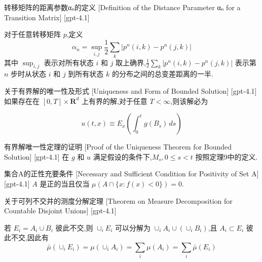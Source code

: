 \documentclass[UTF8]{ctexart}
\begin{document}
    
    
    \begin{dfn}
        {转移矩阵的距离参数αₙ的定义}
        [Definition of the Distance Parameter αₙ for a Transition Matrix]
        [gpt-4.1]
        
对于任意转移矩阵 $p$,定义
\[
\alpha_{n} = \sup_{i, j} \frac{1}{2} \sum_{k} |p^{n}(i, k) - p^{n}(j, k)|
\]
其中 $\sup_{i, j}$ 表示对所有状态 $i$ 和 $j$ 取上确界,$\frac{1}{2} \sum_{k} |p^{n}(i, k) - p^{n}(j, k)|$ 表示第 $n$ 步时从状态 $i$ 和 $j$ 到所有状态 $k$ 的分布之间的总变差距离的一半.

    \end{dfn}
    
    
    
    \begin{thm}
        {关于有界解的唯一性及形式}
        [Uniqueness and Form of Bounded Solution]
        [gpt-4.1]
        如果存在在 $[0, T] \times \mathbf{R}^{d}$ 上有界的解,对于任意 $T < \infty$,则该解必为

\[
u(t, x) \equiv E_{x} \left( \int_{0}^{t} g(B_{s})\, ds \right)
\]

    \end{thm}
    
    
    
    \begin{prf}
        {有界解唯一性定理的证明}
        [Proof of the Uniqueness Theorem for Bounded Solution]
        [gpt-4.1]
        在 $g$ 和 $u$ 满足假设的条件下,$M_{s}, 0 \le s < t$ 按照定理9中的定义.
    \end{prf}
    
    
    
    \begin{thm}
        {集合A的正性充要条件}
        [Necessary and Sufficient Condition for Positivity of Set A]
        [gpt-4.1]
        $A$ 是正的当且仅当 $\mu(A \cap \{x : f(x) < 0\}) = 0$.
    \end{thm}
    
    
    
    \begin{thm}
        {关于可列不交并的测度分解定理}
        [Theorem on Measure Decomposition for Countable Disjoint Unions]
        [gpt-4.1]
        
若 $E_{i} = A_{i} \cup B_{i}$ 彼此不交,则 $\cup_{i} E_{i}$ 可以分解为 $\cup_{i} A_{i} \cup ( \cup_{i} B_{i} )$,且 $A_{i} \subset E_{i}$ 彼此不交,因此有
\[
\bar{\mu} ( \cup_{i} E_{i} ) = \mu ( \cup_{i} A_{i} ) = \sum_{i} \mu ( A_{i} ) = \sum_{i} \bar{\mu} ( E_{i} )
\]

    \end{thm}
    
\end{document}
